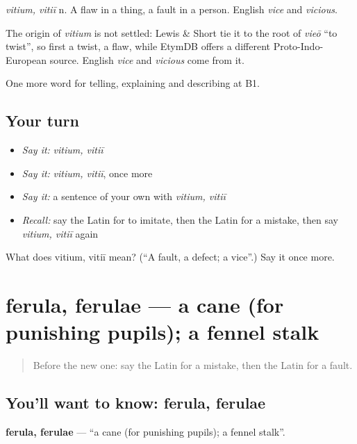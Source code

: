 \emph{vitium, vitiī} n. A flaw in a thing, a fault in a person. English \emph{vice} and \emph{vicious}.

\begin{cousinweb}
The origin of \emph{vitium} is not settled: Lewis \& Short tie it to the root of \emph{vieō} \textquotedblleft{}to twist\textquotedblright{}, so first a twist, a flaw, while EtymDB offers a different Proto-Indo-European source. English \emph{vice} and \emph{vicious} come from it.
\end{cousinweb}

\begin{grammarlens}[title={What you've built}]
One more word for telling, explaining and describing at B1.
\end{grammarlens}

\subsection*{Your turn}
\begin{itemize}
\raggedright
  \item \emph{Say it:} \emph{vitium, vitiī}
  \item \emph{Say it:} \emph{vitium, vitiī}, once more
  \item \emph{Say it:} a sentence of your own with \emph{vitium, vitiī}
  \item \emph{Recall:} say the Latin for to imitate, then the Latin for a mistake, then say \emph{vitium, vitiī} again
\end{itemize}

\begin{tcolorbox}[breakable,colback=teal!4,colframe=teal!35!black,title={Before you move on}]
What does vitium, vitiī mean? (\textquotedblleft{}A fault, a defect; a vice\textquotedblright{}.) Say it once more.
\end{tcolorbox}
\section[ferula, ferulae]{ferula, ferulae — a cane (for punishing pupils); a fennel stalk}

\label{lesson:LA-C408-ferula}



\begin{quote}
Before the new one: say the Latin for a mistake, then the Latin for a fault.
\end{quote}

\subsection*{You'll want to know: ferula, ferulae}
\textbf{ferula, ferulae} — \textquotedblleft{}a cane (for punishing pupils); a fennel stalk\textquotedblright{}.

